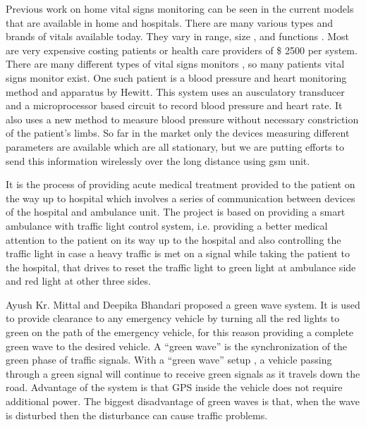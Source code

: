 \documentclass[12pt,a4paper,oneside,openright]{report}
\begin{document}
Previous work on home vital signs monitoring can be seen in the current models that are available in home and hospitals. There are many various types and brands of vitals available today.  They vary in range, size , and functions . Most are very expensive costing patients or health care providers of \$ 2500 per system. There are many different types of vital signs monitors , so many patients vital signs monitor exist. One such patient is a blood pressure and heart monitoring method and apparatus by Hewitt. This system uses an ausculatory transducer and a microprocessor based circuit to record blood pressure and heart rate. It also uses a new method to measure blood pressure without necessary constriction of the patient’s limbs. So far in the market only the devices measuring different parameters are available which are all stationary, but we are putting efforts to send this information wirelessly over the long distance using gsm unit.

It is the process of providing acute medical treatment provided to the patient on the way up to hospital which involves a series of communication between devices of the hospital and ambulance unit. The project is based on providing a smart ambulance with traffic light control system,  i.e. providing a better medical attention to the patient on its way up  to the hospital and also controlling the traffic light in case a heavy traffic is met on a signal while taking the patient to the hospital, that drives to reset the traffic light to green light at ambulance side and red light at other three sides. 

Ayush Kr. Mittal and Deepika Bhandari proposed a green wave system. It is used to provide clearance to any emergency vehicle by turning all the red lights to green on the path of the emergency vehicle, for this reason providing a complete green wave to the desired vehicle. A “green wave” is the synchronization of the green phase of traffic signals. With a “green wave” setup , a vehicle passing through a green signal will continue to receive green signals as it travels down the road. Advantage of the system is that GPS inside the vehicle does not require additional power. The biggest disadvantage of green waves is that, when the wave is disturbed then the disturbance can cause traffic problems. 
\end{document}
